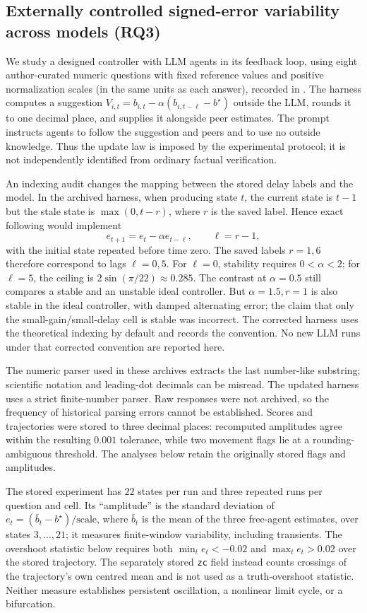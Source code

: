 \documentclass[11pt]{article}
\theoremstyle{definition}
\begin{document}
\subsection{Externally controlled signed-error variability across models (RQ3)}

We study a designed controller with LLM agents in its feedback loop, using eight author-curated
numeric questions with fixed reference values and positive normalization scales (in the same units
as each answer), recorded in . The harness computes a suggestion
$V_{i,t}=b_{i,t}-\alpha(b_{i,t-\ell}-b^\star)$ outside the LLM, rounds it to one decimal place,
and supplies it alongside peer estimates. The prompt instructs agents to follow the suggestion and
peers and to use no outside knowledge. Thus the update law is imposed by the experimental protocol;
it is not independently identified from ordinary factual verification.

An indexing audit changes the mapping between the stored delay labels and the model. In the archived
harness, when producing state $t$, the current state is $t-1$ but the stale state is
$\max(0,t-r)$, where $r$ is the saved label. Hence exact following would implement
\[
 e_{t+1}=e_t-\alpha e_{t-\ell},\qquad \ell=r-1,
\]
with the initial state repeated before time zero. The saved labels $r=1,6$ therefore correspond to
lags $\ell=0,5$. For $\ell=0$, stability requires $0<\alpha<2$; for $\ell=5$, the ceiling is
$2\sin(\pi/22)\approx0.285$. The contrast at $\alpha=0.5$ still compares a stable and an unstable
ideal controller. But $\alpha=1.5,r=1$ is also stable in the ideal controller, with damped alternating
error; the claim that only the small-gain/small-delay cell is stable was incorrect.
The corrected harness uses the theoretical indexing by default and records the convention. No new
LLM runs under that corrected convention are reported here.

The numeric parser used in these archives extracts the last number-like substring; scientific
notation and leading-dot decimals can be misread. The updated harness uses a strict finite-number
parser. Raw responses were not archived, so the frequency of historical parsing errors cannot be
established. Scores and trajectories were stored to three decimal places: recomputed amplitudes
agree within the resulting $0.001$ tolerance, while two movement flags lie at a rounding-ambiguous
threshold. The analyses below retain the originally stored flags and amplitudes.

The stored experiment has $22$ states per run and three repeated runs per question and cell. Its
``amplitude'' is the standard deviation of $e_t=(\bar b_t-b^\star)/\mathrm{scale}$, where
$\bar b_t$ is the mean of the three free-agent estimates, over states
$3,\ldots,21$; it measures finite-window variability, including transients. The overshoot statistic
below requires both $\min_t e_t<-0.02$ and $\max_t e_t>0.02$ over the stored trajectory.
The separately stored \texttt{zc} field instead counts crossings of the trajectory's own centred
mean and is not used as a truth-overshoot statistic. Neither measure establishes persistent
oscillation, a nonlinear limit cycle, or a bifurcation.
\end{document}

